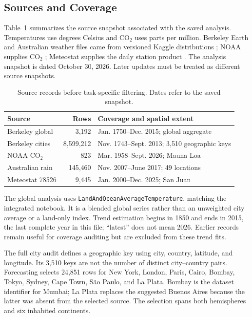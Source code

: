 \documentclass[conference]{IEEEtran}
\begin{document}
\subsection{Sources and Coverage}
Table~\ref{tab:data} summarizes the source snapshot associated with the saved analysis. Temperatures use degrees Celsius and CO$_2$ uses parts per million. Berkeley Earth and Australian weather files came from versioned Kaggle distributions \cite{berkeley,kaggleberkeley,australia}; NOAA supplies CO$_2$ \cite{noaa}; Meteostat supplies the daily station product \cite{meteostat}. The analysis snapshot is dated October 30, 2026. Later updates must be treated as different source snapshots.
\begin{table}[t]
\caption{Source records before task-specific filtering. Dates refer to the saved snapshot.}\label{tab:data}\centering\footnotesize
\begin{tabular}{p{}r p{}}
\toprule Source & Rows & Coverage and spatial extent \\\midrule
Berkeley global & 3,192 & Jan. 1750--Dec. 2015; global aggregate \\
Berkeley cities & 8,599,212 & Nov. 1743--Sept. 2013; 3,510 geographic keys \\
NOAA CO$_2$ & 823 & Mar. 1958--Sept. 2026; Mauna Loa \\
Australian rain & 145,460 & Nov. 2007--June 2017; 49 locations \\
Meteostat 78526 & 9,445 & Jan. 2000--Dec. 2025; San Juan \\\bottomrule
\end{tabular}\end{table}
The global analysis uses \texttt{LandAndOceanAverageTemperature}, matching the integrated notebook. It is a blended global series rather than an unweighted city average or a land-only index. Trend estimation begins in 1850 and ends in 2015, the last complete year in this file; ``latest'' does not mean 2026. Earlier records remain useful for coverage auditing but are excluded from these trend fits.

The full city audit defines a geographic key using city, country, latitude, and longitude. Its 3,510 keys are not the number of distinct city--country pairs. Forecasting selects 24,851 rows for New York, London, Paris, Cairo, Bombay, Tokyo, Sydney, Cape Town, S\~ao Paulo, and La Plata. Bombay is the dataset identifier for Mumbai; La Plata replaces the suggested Buenos Aires because the latter was absent from the selected source. The selection spans both hemispheres and six inhabited continents.
\end{document}
